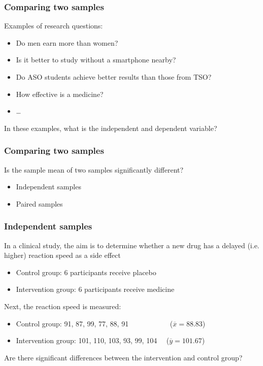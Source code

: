 \documentclass[aspectratio=169]{beamer}
\begin{document}
\begin{frame}
  \frametitle{Comparing two samples}
  
  Examples of research questions:
  
  \begin{itemize}
    \item Do men earn more than women?
    \item Is it better to study without a smartphone nearby?
    \item Do ASO students achieve better results than those from TSO?
    \item How effective is a medicine?
    \item \ldots
  \end{itemize}

  In these examples, what is the independent and dependent variable?
\end{frame}

\begin{frame}
  \frametitle{Comparing two samples}
  
  Is the sample mean of two samples significantly different?
  
  \begin{itemize}
    \item Independent samples
    \item Paired samples
  \end{itemize}
\end{frame}

\begin{frame}
  \frametitle{Independent samples}
  
  In a clinical study, the aim is to determine whether a new drug has a delayed (i.e. higher) reaction speed as a side effect
  
  \begin{itemize}
    \item Control group: 6 participants receive placebo
    \item Intervention group: 6 participants receive medicine
  \end{itemize}
  
  \pause
  
  Next, the reaction speed is measured:
  
  \begin{itemize}
    \item Control group: 91, 87, 99, 77, 88, 91 ~~~~~~~~~~~($\overline{x}=88.83$)
    \item Intervention group: 101, 110, 103, 93, 99, 104 ~~($\overline{y}=101.67$)
  \end{itemize}
  
  Are there significant differences between the intervention and control group?
\end{frame}
\end{document}
